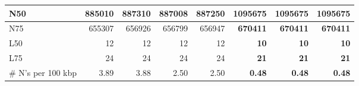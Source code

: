 \documentclass[12pt,a4paper]{article}
\begin{document}
\begin{table}[ht]
\begin{center}
\begin{tabular}{|l*{7}{|r}|}
N50 & 885010 & 887310 & 887008 & 887250 & {\bf 1095675} & {\bf 1095675} & {\bf 1095675} \\ \hline
N75 & 655307 & 656926 & 656799 & 656947 & {\bf 670411} & {\bf 670411} & {\bf 670411} \\ \hline
L50 & 12 & 12 & 12 & 12 & {\bf 10} & {\bf 10} & {\bf 10} \\ \hline
L75 & 24 & 24 & 24 & 24 & {\bf 21} & {\bf 21} & {\bf 21} \\ \hline
\# N's per 100 kbp & 3.89 & 3.88 & 2.50 & 2.50 & {\bf 0.48} & {\bf 0.48} & {\bf 0.48} \\ \hline
\end{tabular}
\end{center}
\end{table}
\end{document}
